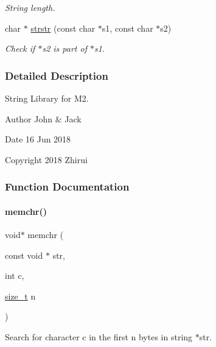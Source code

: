 \begin{DoxyCompactItemize}
\begin{DoxyCompactList}\small\item\em String length. \end{DoxyCompactList}\item 
char $\ast$ \mbox{\hyperlink{a00071_aeb923ee2a7a01f82eb1e2f8ae188c6d4}{strstr}} (const char $\ast$s1, const char $\ast$s2)
\begin{DoxyCompactList}\small\item\em Check if $\ast$s2 is part of $\ast$s1. \end{DoxyCompactList}\end{DoxyCompactItemize}


\subsubsection{Detailed Description}
String Library for M2. 

\begin{DoxyAuthor}{Author}
John \& Jack 
\end{DoxyAuthor}
\begin{DoxyDate}{Date}
16 Jun 2018 
\end{DoxyDate}
\begin{DoxyCopyright}{Copyright}
2018 Zhirui 
\end{DoxyCopyright}


\subsubsection{Function Documentation}
\mbox{\label{a00071_af2c756015b1cb92274fc019a175ae8bb}} 
\paragraph{\texorpdfstring{memchr()}{memchr()}}
{\footnotesize\ttfamily void$\ast$ memchr (\begin{DoxyParamCaption}\item[{const void $\ast$}]{str,  }\item[{int}]{c,  }\item[{\mbox{\hyperlink{a00074_a43b4547e12226fef871eed8afe191ad7}{size\+\_\+t}}}]{n }\end{DoxyParamCaption})}



Search for character c in the first n bytes in string $\ast$str. 


